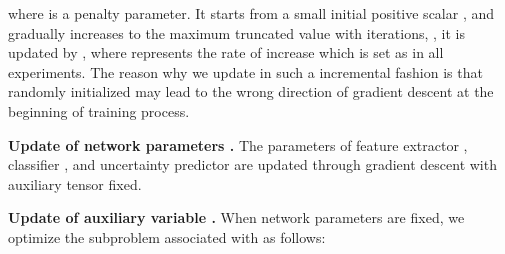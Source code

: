 \documentclass[10pt,twocolumn,letterpaper]{article}
\begin{document}
where  is a penalty parameter. It starts from a small initial positive scalar , and gradually increases to the maximum truncated value  with iterations, \ie, it is updated by , where  represents the rate of increase which is set as  in all experiments. The reason why we update  in such a incremental fashion is that randomly initialized  may lead to the wrong direction of gradient descent at the beginning of training process.  \par 
\textbf{Update of network parameters .} The parameters of feature extractor , classifier , and uncertainty predictor  are updated through gradient descent with auxiliary tensor  fixed. \par
\textbf{Update of auxiliary variable .} When network parameters are fixed, we optimize the subproblem associated with  as follows:
  
\end{document}
